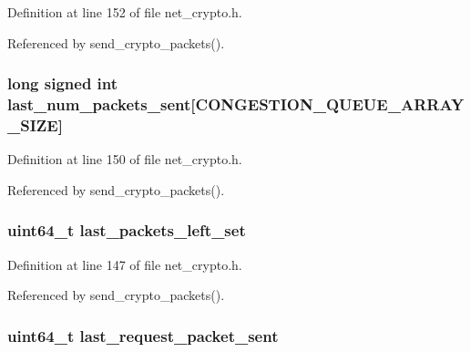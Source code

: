 Definition at line 152 of file net\+\_\+crypto.\+h.



Referenced by send\+\_\+crypto\+\_\+packets().

\hypertarget{struct_crypto___connection_aa6d1d107adcffe30564bf3837faefca4}{
\subsubsection[{last\+\_\+num\+\_\+packets\+\_\+sent}]{\setlength{\rightskip}{0pt plus 5cm}long signed int last\+\_\+num\+\_\+packets\+\_\+sent\mbox{[}{\bf C\+O\+N\+G\+E\+S\+T\+I\+O\+N\+\_\+\+Q\+U\+E\+U\+E\+\_\+\+A\+R\+R\+A\+Y\+\_\+\+S\+I\+Z\+E}\mbox{]}}}\label{struct_crypto___connection_aa6d1d107adcffe30564bf3837faefca4}


Definition at line 150 of file net\+\_\+crypto.\+h.



Referenced by send\+\_\+crypto\+\_\+packets().

\hypertarget{struct_crypto___connection_a3c50560fad9a00689d5d3f143f4b56aa}{
\subsubsection[{last\+\_\+packets\+\_\+left\+\_\+set}]{\setlength{\rightskip}{0pt plus 5cm}uint64\+\_\+t last\+\_\+packets\+\_\+left\+\_\+set}}\label{struct_crypto___connection_a3c50560fad9a00689d5d3f143f4b56aa}


Definition at line 147 of file net\+\_\+crypto.\+h.



Referenced by send\+\_\+crypto\+\_\+packets().

\hypertarget{struct_crypto___connection_aa0c15e9ada39b9e8d1f27e2a10ad2e0e}{
\subsubsection[{last\+\_\+request\+\_\+packet\+\_\+sent}]{\setlength{\rightskip}{0pt plus 5cm}uint64\+\_\+t last\+\_\+request\+\_\+packet\+\_\+sent}}\label{struct_crypto___connection_aa0c15e9ada39b9e8d1f27e2a10ad2e0e}


